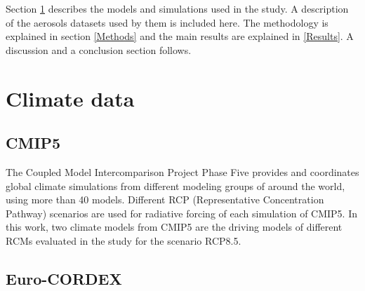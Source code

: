    

   Section \ref{Climate data} describes the models and simulations used in the study. A description of the aerosols datasets used by them is included here. The methodology is explained in section \ref{Methods} and the main results are explained in \ref{Results}. A discussion and a conclusion section follows.

{\section{Climate data}\label{Climate data}}

\subsection{CMIP5}

The Coupled Model Intercomparison Project Phase Five provides and coordinates global climate simulations from different modeling groups \cite*{Taylor2012} of around the world, using more than 40 models. Different RCP (Representative Concentration Pathway) scenarios are used for radiative forcing of each simulation of CMIP5. In this work, two climate models from CMIP5 are the driving models of different RCMs evaluated in the study for the scenario RCP8.5.

\subsection{Euro-CORDEX}

